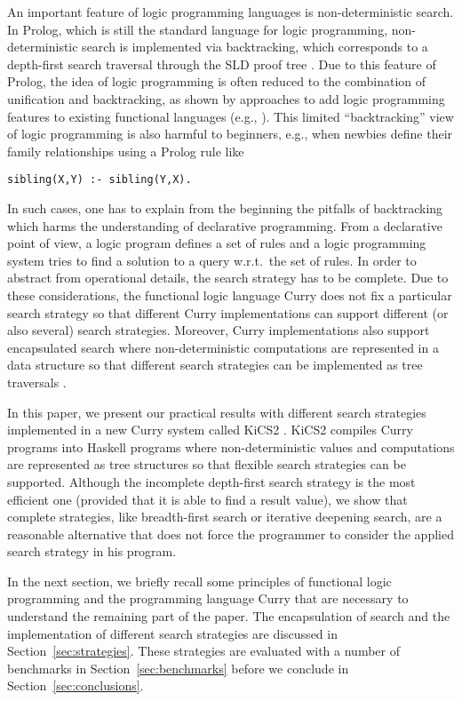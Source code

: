 \documentclass[english]{lni}
\begin{document}
An important feature of logic programming languages
is non-deterministic search.
In Prolog, which is still the standard language for logic programming,
non-deterministic search is implemented via backtracking,
which corresponds to a depth-first search traversal
through the SLD proof tree \cite{Lloyd87}.
Due to this feature of Prolog,
the idea of logic programming is often reduced to
the combination of unification and backtracking,
as shown by approaches to add logic programming features
to existing functional languages
(e.g., \cite{ClaessenLjungloef00,Hinze01}).
This limited ``backtracking'' view of logic programming
is also harmful to beginners, e.g., when newbies
define their family relationships using a Prolog rule like
\begin{lstlisting}
sibling(X,Y) :- sibling(Y,X).
\end{lstlisting}
In such cases, one has to explain from the beginning
the pitfalls of backtracking which harms the understanding
of declarative programming.
From a declarative point of view,
a logic program defines a set of rules
and a logic programming system tries to find
a solution to a query w.r.t.\ the set of rules.
In order to abstract from operational details,
the search strategy has to be complete.
Due to these considerations,
the functional logic language Curry \cite{Hanus06Curry}
does not fix a particular search strategy
so that different Curry implementations can support
different (or also several) search strategies.
Moreover, Curry implementations also
support encapsulated search
where non-deterministic computations are represented
in a data structure so that different search strategies
can be implemented as tree traversals
\cite{BrasselHanusHuch04JFLP,HanusSteiner98PLILP,Lux99FLOPS}.

In this paper, we present our practical results
with different search strategies implemented
in a new Curry system called
KiCS2 \cite{BrasselHanusPeemoellerReck11}.
KiCS2 compiles Curry programs into Haskell programs
where non-deterministic values and computations are represented
as tree structures so that flexible search strategies
can be supported.
Although the incomplete depth-first search strategy
is the most efficient one (provided that it is able
to find a result value),
we show that complete strategies,
like breadth-first search or iterative deepening search,
are a reasonable alternative that does not force
the programmer to consider the applied search strategy
in his program.

In the next section, we briefly recall some principles
of functional logic programming and the programming language Curry
that are necessary to understand the remaining part of the paper.
The encapsulation of search and the implementation of different
search strategies are discussed in Section~\ref{sec:strategies}.
These strategies are evaluated with a number of benchmarks
in Section~\ref{sec:benchmarks}
before we conclude in Section~\ref{sec:conclusions}.
\end{document}
